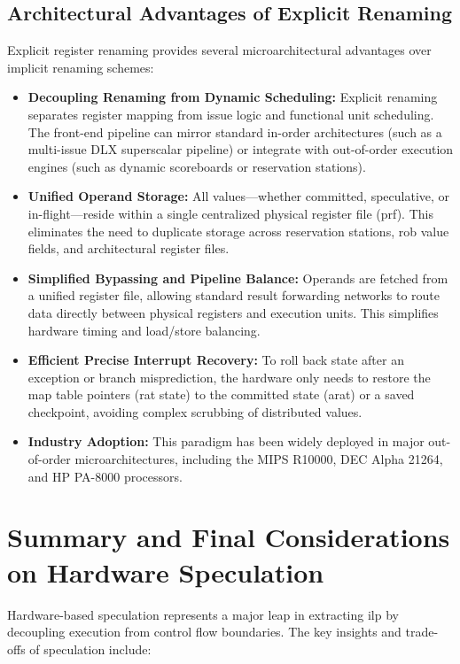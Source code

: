 \subsection{Architectural Advantages of Explicit Renaming}
Explicit register renaming provides several microarchitectural advantages over implicit renaming schemes:

\begin{itemize}
    \item \textbf{Decoupling Renaming from Dynamic Scheduling:} Explicit renaming separates register mapping from issue logic and functional unit scheduling. The front-end pipeline can mirror standard in-order architectures (such as a multi-issue \textsf{DLX} superscalar pipeline) or integrate with out-of-order execution engines (such as dynamic scoreboards or reservation stations).
    \item \textbf{Unified Operand Storage:} All values—whether committed, speculative, or in-flight—reside within a single centralized physical register file (\gls{prf}). This eliminates the need to duplicate storage across reservation stations, \gls{rob} value fields, and architectural register files.
    \item \textbf{Simplified Bypassing and Pipeline Balance:} Operands are fetched from a unified register file, allowing standard result forwarding networks to route data directly between physical registers and execution units. This simplifies hardware timing and load/store balancing.
    \item \textbf{Efficient Precise Interrupt Recovery:} To roll back state after an exception or branch misprediction, the hardware only needs to restore the map table pointers (\gls{rat} state) to the committed state (\gls{arat}) or a saved checkpoint, avoiding complex scrubbing of distributed values.
    \item \textbf{Industry Adoption:} This paradigm has been widely deployed in major out-of-order microarchitectures, including the MIPS R10000, DEC Alpha 21264, and HP PA-8000 processors.
\end{itemize}

\section{Summary and Final Considerations on Hardware Speculation}
\label{sec:hw_speculation_summary}

Hardware-based speculation represents a major leap in extracting \gls{ilp} by decoupling execution from control flow boundaries. The key insights and trade-offs of speculation include:

